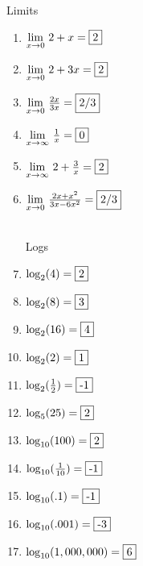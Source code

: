 \documentclass{article}
\begin{document}
\newtheorem*{theorem*}{Theorem}
	
	
	\centerline{\Large{ Limits}}\vspace{12 pt}
	\begin{enumerate} 
	\item $\underset{x \rightarrow 0}{\lim} \ 2+x=\fbox{2}$
	\item $\underset{x \rightarrow 0}{\lim} \ 2+3x=\fbox{2}$
	\item $\underset{x \rightarrow 0}{\lim} \ \frac{2x}{3x}=\fbox{2/3}$
\item $\underset{x \rightarrow \infty}{\lim} \ \frac{1}{x}=\fbox{0}$
	\item $\underset{x \rightarrow \infty}{\lim} \ 2 + \frac{3}{x}=\fbox{2}$ 
	\item $\underset{x \rightarrow 0}{\lim} \ \frac{2x + x^2}{3x - 6x^2}=\fbox{2/3}$
	\\ \\
	\centerline{\Large{ Logs \ \ \ \ \ \ \ \ \ \ \ }}\vspace{12 pt}
	\item $\log_2(4) = \fbox{2}$
	\item $\log_2(8) = \fbox{3}$
	\item $\log_2(16) = \fbox{4}$
	\item $\log_2(2) = \fbox{1}$
	\item $\log_2(\frac{1}{2}) = \fbox{-1}$
	\item $\log_5(25) = \fbox{2}$
	\item $\log_{10}(100) = \fbox{2}$
	\item $\log_{10}(\frac{1}{10}) = \fbox{-1}$
	\item $\log_{10}(.1) = \fbox{-1}$
	\item $\log_{10}(.001) = \fbox{-3}$
	\item $\log_{10}(1,000,000) = \fbox{6}$
	
	\end{enumerate}
    

	
\end{document}
